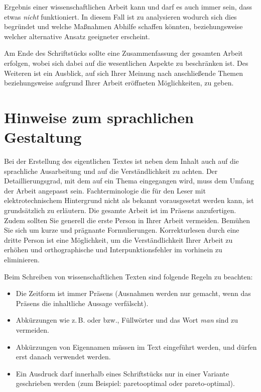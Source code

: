 Ergebnis einer wissenschaftlichen Arbeit kann und darf es auch immer sein, dass etwas \emph{nicht} funktioniert. In diesem Fall ist zu analysieren wodurch sich dies begründet und welche Maßnahmen Abhilfe schaffen könnten, beziehungsweise welcher alternative Ansatz geeigneter erscheint.

Am Ende des Schriftstücks sollte eine Zusammenfassung der gesamten Arbeit
erfolgen, wobei sich dabei auf die wesentlichen Aspekte zu
beschränken ist. Des Weiteren ist ein Ausblick, auf sich Ihrer
Meinung nach anschließende Themen beziehungsweise aufgrund Ihrer
Arbeit eröffneten Möglichkeiten, zu geben.



\section{Hinweise zum sprachlichen Gestaltung}
\label{hinweise:sprache}

Bei der Erstellung des eigentlichen Textes ist neben dem Inhalt
auch auf die sprachliche Ausarbeitung und auf die Verständlichkeit
zu achten. Der Detaillierungsgrad, mit dem auf ein Thema
eingegangen wird, muss dem Umfang der Arbeit angepasst sein.
Fachterminologie die für den Leser mit elektrotechnischem
Hintergrund nicht als bekannt vorausgesetzt werden kann, ist
grundsätzlich zu erläutern. Die gesamte Arbeit ist im Präsens
anzufertigen. Zudem sollten Sie generell die erste Person in Ihrer
Arbeit vermeiden. Bemühen Sie sich um kurze und prägnante
Formulierungen. Korrekturlesen durch eine dritte Person ist eine
Möglichkeit, um die Verständlichkeit Ihrer Arbeit zu erhöhen und
orthographische und Interpunktionsfehler im vorhinein zu
eliminieren.

Beim Schreiben von wissenschaftlichen Texten sind folgende Regeln zu beachten:

\begin{itemize}
  \item Die Zeitform ist immer Präsens (Ausnahmen werden nur gemacht, wenn das Präsens die inhaltliche Aussage verfälscht).
  \item Abkürzungen wie z.\,B. oder bzw., Füllwörter und das Wort \textit{man} sind zu vermeiden.
  \item Abkürzungen von Eigennamen müssen im Text eingeführt werden, und dürfen erst danach verwendet werden.
  \item Ein Ausdruck darf innerhalb eines Schriftstücks nur in einer Variante geschrieben werden (zum Beispiel: paretooptimal oder pareto-optimal).
\end{itemize}


